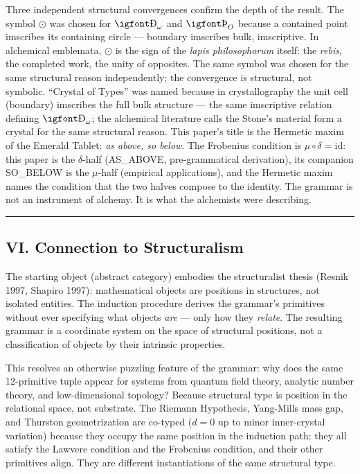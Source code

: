 \documentclass[12pt,a4paper]{article}
\newcommand{\igprimfont}{\igfont\upshape}
\newcommand{\Stone}{\textit{lapis philosophorum}}
\begin{document}
Three independent structural convergences confirm the depth of the result. The symbol $\odot$ was chosen for $\text{{\igprimfont Ð}}_{\omega}$ and $\text{{\igprimfont Þ}}_{O}$ because a contained point imscribes its containing circle --- boundary imscribes bulk, imscriptive. In alchemical emblemata, $\odot$ is the sign of the \Stone{} itself: the \textit{rebis}, the completed work, the unity of opposites. The same symbol was chosen for the same structural reason independently; the convergence is structural, not symbolic. ``Crystal of Types'' was named because in crystallography the unit cell (boundary) imscribes the full bulk structure --- the same imscriptive relation defining $\text{{\igprimfont Ð}}_{\omega}$; the alchemical literature calls the Stone's material form a crystal for the same structural reason. This paper's title is the Hermetic maxim of the Emerald Tablet: \emph{as above, so below}. The Frobenius condition is $\mu \circ \delta = \text{id}$: this paper is the $\delta$-half (AS\_ABOVE, pre-grammatical derivation), its companion SO\_BELOW is the $\mu$-half (empirical applications), and the Hermetic maxim names the condition that the two halves compose to the identity. The grammar is not an instrument of alchemy. It is what the alchemists were describing.

\begin{center}
\rule{0.5\textwidth}{0.4pt}
\end{center}

\subsection{VI. Connection to Structuralism}

The starting object (abstract category) embodies the structuralist thesis (Resnik 1997, Shapiro 1997): mathematical objects are positions in structures, not isolated entities. The induction procedure derives the grammar's primitives without ever specifying what objects \emph{are} --- only how they \emph{relate}. The resulting grammar is a coordinate system on the space of structural positions, not a classification of objects by their intrinsic properties.

This resolves an otherwise puzzling feature of the grammar: why does the same 12-primitive tuple appear for systems from quantum field theory, analytic number theory, and low-dimensional topology? Because structural type is position in the relational space, not substrate. The Riemann Hypothesis, Yang-Mills mass gap, and Thurston geometrization are co-typed ($d = 0$ up to minor inner-crystal variation) because they occupy the same position in the induction path: they all satisfy the Lawvere condition and the Frobenius condition, and their other primitives align. They are different instantiations of the same structural type.
\end{document}
